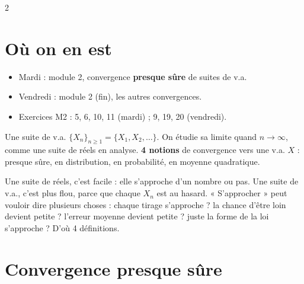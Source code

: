 \documentclass[a4paper,9pt]{extarticle}
\begin{document}

\thispagestyle{fancy}



\begin{multicols}{2}


\section{Où on en est}


\begin{summary}

\begin{itemize}

\item Mardi : module 2, convergence \textbf{presque sûre} de suites de v.a.

\item Vendredi : module 2 (fin), les autres convergences.

\item Exercices M2 : 5, 6, 10, 11 (mardi) ; 9, 19, 20 (vendredi).

\end{itemize}

\end{summary}


\begin{definition}

Une suite de v.a. $\{X_n\}_{n\ge1} = \{X_1, X_2, \dots\}$. On étudie sa limite quand $n \to
\infty$, comme une suite de réels en analyse. \textbf{4 notions} de convergence vers une v.a.
$X$ : presque sûre, en distribution, en probabilité, en moyenne quadratique.

\end{definition}


\begin{simple}

Une suite de réels, c'est facile : elle s'approche d'un nombre ou pas. Une suite de v.a., c'est
plus flou, parce que chaque $X_n$ est au hasard. « S'approcher » peut vouloir dire plusieurs
choses : chaque tirage s'approche ? la chance d'être loin devient petite ? l'erreur moyenne
devient petite ? juste la forme de la loi s'approche ? D'où 4 définitions.

\end{simple}


\section{Convergence presque sûre}



\end{multicols}
\end{document}
